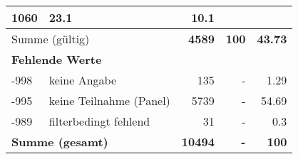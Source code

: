 \begin{longtable}{lXrrr}
       \num{1060} &
       \num[round-mode=places,round-precision=2]{23.1} &
         \num[round-mode=places,round-precision=2]{10.1} \\
     \midrule
     \multicolumn{2}{l}{Summe (gültig)} &
       \textbf{\num{4589}} &
     \textbf{\num{100}} &
       \textbf{\num[round-mode=places,round-precision=2]{43.73}} \\
     \multicolumn{5}{l}{\textbf{Fehlende Werte}}\\
       -998 &
       keine Angabe &
         \num{135} &
        - &
         \num[round-mode=places,round-precision=2]{1.29} \\
       -995 &
       keine Teilnahme (Panel) &
         \num{5739} &
        - &
         \num[round-mode=places,round-precision=2]{54.69} \\
       -989 &
       filterbedingt fehlend &
         \num{31} &
        - &
         \num[round-mode=places,round-precision=2]{0.3} \\
     \midrule
     \multicolumn{2}{l}{\textbf{Summe (gesamt)}} &
          \textbf{\num{10494}} &
        \textbf{-} &
        \textbf{\num{100}} \\
     \bottomrule
     \end{longtable}
     

